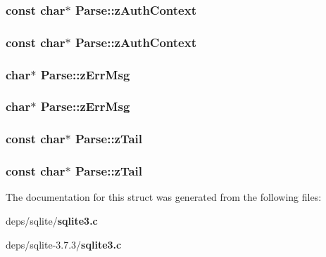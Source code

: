 \subsubsection{\setlength{\rightskip}{0pt plus 5cm}const char$\ast$ \bf{Parse::z\-Auth\-Context}}\label{structParse_b69ec0ee978c09c98abf1002128c8981}


\subsubsection{\setlength{\rightskip}{0pt plus 5cm}const char$\ast$ \bf{Parse::z\-Auth\-Context}}\label{structParse_b69ec0ee978c09c98abf1002128c8981}


\subsubsection{\setlength{\rightskip}{0pt plus 5cm}char$\ast$ \bf{Parse::z\-Err\-Msg}}\label{structParse_7fca04462d31709cb25e784fbdf9efce}


\subsubsection{\setlength{\rightskip}{0pt plus 5cm}char$\ast$ \bf{Parse::z\-Err\-Msg}}\label{structParse_7fca04462d31709cb25e784fbdf9efce}


\subsubsection{\setlength{\rightskip}{0pt plus 5cm}const char$\ast$ \bf{Parse::z\-Tail}}\label{structParse_6ad0ea9af8b113ea036320934ebc9d2a}


\subsubsection{\setlength{\rightskip}{0pt plus 5cm}const char$\ast$ \bf{Parse::z\-Tail}}\label{structParse_6ad0ea9af8b113ea036320934ebc9d2a}




The documentation for this struct was generated from the following files:\begin{CompactItemize}
\item 
deps/sqlite/\bf{sqlite3.c}\item 
deps/sqlite-3.7.3/\bf{sqlite3.c}\end{CompactItemize}
